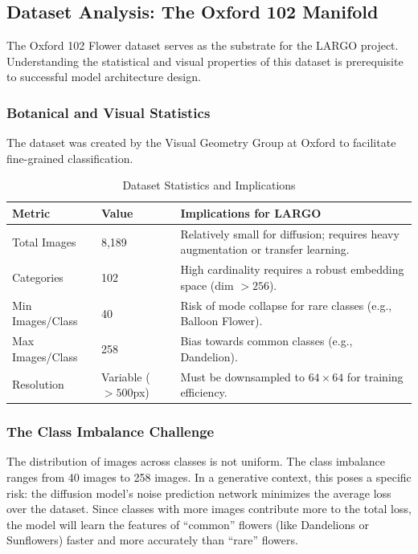 \documentclass[12pt, a4paper]{article}
\begin{document}
\subsection{Dataset Analysis: The Oxford 102 Manifold}

The Oxford 102 Flower dataset \cite{oxford102} serves as the substrate for the LARGO project. Understanding the statistical and visual properties of this dataset is prerequisite to successful model architecture design.

\subsubsection{Botanical and Visual Statistics}
The dataset was created by the Visual Geometry Group at Oxford to facilitate fine-grained classification.

\begin{table}[htbp]
    \centering
    \caption{Dataset Statistics and Implications}
    \begin{tabular}{@{}lp{}p{}@{}}
        \toprule
        \textbf{Metric} & \textbf{Value} & \textbf{Implications for LARGO} \\
        \midrule
        Total Images & 8,189 & Relatively small for diffusion; requires heavy augmentation or transfer learning. \\
        Categories & 102 & High cardinality requires a robust embedding space (dim $> 256$). \\
        Min Images/Class & 40 & Risk of mode collapse for rare classes (e.g., Balloon Flower). \\
        Max Images/Class & 258 & Bias towards common classes (e.g., Dandelion). \\
        Resolution & Variable ($>500$px) & Must be downsampled to $64 \times 64$ for training efficiency. \\
        \bottomrule
    \end{tabular}
\end{table}

\subsubsection{The Class Imbalance Challenge}
The distribution of images across classes is not uniform. The class imbalance ranges from 40 images to 258 images. In a generative context, this poses a specific risk: the diffusion model's noise prediction network minimizes the average loss over the dataset. Since classes with more images contribute more to the total loss, the model will learn the features of ``common'' flowers (like Dandelions or Sunflowers) faster and more accurately than ``rare'' flowers.
\end{document}

